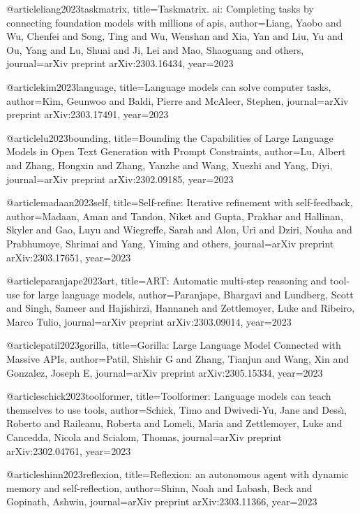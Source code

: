 @article{liang2023taskmatrix,
  title={Taskmatrix. ai: Completing tasks by connecting foundation models with millions of apis},
  author={Liang, Yaobo and Wu, Chenfei and Song, Ting and Wu, Wenshan and Xia, Yan and Liu, Yu and Ou, Yang and Lu, Shuai and Ji, Lei and Mao, Shaoguang and others},
  journal={arXiv preprint arXiv:2303.16434},
  year={2023}
}

@article{kim2023language,
  title={Language models can solve computer tasks},
  author={Kim, Geunwoo and Baldi, Pierre and McAleer, Stephen},
  journal={arXiv preprint arXiv:2303.17491},
  year={2023}
}

@article{lu2023bounding,
  title={Bounding the Capabilities of Large Language Models in Open Text Generation with Prompt Constraints},
  author={Lu, Albert and Zhang, Hongxin and Zhang, Yanzhe and Wang, Xuezhi and Yang, Diyi},
  journal={arXiv preprint arXiv:2302.09185},
  year={2023}
}

@article{madaan2023self,
  title={Self-refine: Iterative refinement with self-feedback},
  author={Madaan, Aman and Tandon, Niket and Gupta, Prakhar and Hallinan, Skyler and Gao, Luyu and Wiegreffe, Sarah and Alon, Uri and Dziri, Nouha and Prabhumoye, Shrimai and Yang, Yiming and others},
  journal={arXiv preprint arXiv:2303.17651},
  year={2023}
}

@article{paranjape2023art,
  title={ART: Automatic multi-step reasoning and tool-use for large language models},
  author={Paranjape, Bhargavi and Lundberg, Scott and Singh, Sameer and Hajishirzi, Hannaneh and Zettlemoyer, Luke and Ribeiro, Marco Tulio},
  journal={arXiv preprint arXiv:2303.09014},
  year={2023}
}

@article{patil2023gorilla,
  title={Gorilla: Large Language Model Connected with Massive APIs},
  author={Patil, Shishir G and Zhang, Tianjun and Wang, Xin and Gonzalez, Joseph E},
  journal={arXiv preprint arXiv:2305.15334},
  year={2023}
}

@article{schick2023toolformer,
  title={Toolformer: Language models can teach themselves to use tools},
  author={Schick, Timo and Dwivedi-Yu, Jane and Dess{\`\i}, Roberto and Raileanu, Roberta and Lomeli, Maria and Zettlemoyer, Luke and Cancedda, Nicola and Scialom, Thomas},
  journal={arXiv preprint arXiv:2302.04761},
  year={2023}
}

@article{shinn2023reflexion,
  title={Reflexion: an autonomous agent with dynamic memory and self-reflection},
  author={Shinn, Noah and Labash, Beck and Gopinath, Ashwin},
  journal={arXiv preprint arXiv:2303.11366},
  year={2023}
}

